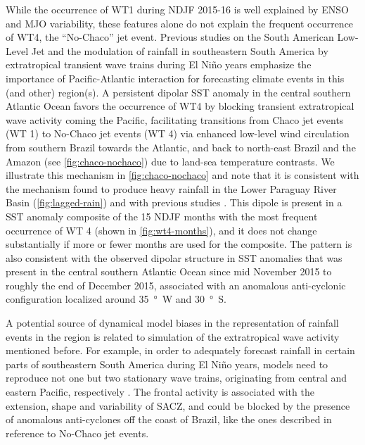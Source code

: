 \documentclass{ametsoc}
\begin{document}
While the occurrence of WT1 during NDJF 2015-16 is well explained by ENSO and MJO variability, these features alone do not explain the frequent occurrence of WT4, the ``No-Chaco'' jet event.
Previous studies on the South American Low-Level Jet \citep[e.g.,][]{Vera:2006ib} and the modulation of rainfall in southeastern South America by extratropical transient wave trains during El Ni\~no years \citep{Barreiro:2017ct} emphasize the importance of Pacific-Atlantic interaction for forecasting climate events in this (and other) region(s).
A persistent dipolar SST anomaly in the central southern Atlantic Ocean favors the occurrence of WT4 by blocking transient extratropical wave activity coming the Pacific, facilitating transitions from Chaco jet events (WT 1) to No-Chaco jet events (WT 4) via enhanced low-level wind circulation from southern Brazil towards the Atlantic, and back to north-east Brazil and the Amazon (see \cref{fig:chaco-nochaco}) due to land-sea temperature contrasts.
We illustrate this mechanism in \cref{fig:chaco-nochaco} and note that it is consistent with the mechanism found to produce heavy rainfall in the Lower Paraguay River Basin (\cref{fig:lagged-rain}) and with previous studies \citep[e.g.,][]{Vera:2006ib,Liebmann:2004kx,Salio:2002ev}.
This dipole is present in a SST anomaly composite of the 15 NDJF months with the most frequent occurrence of WT 4 (shown in \cref{fig:wt4-months}), and it does not change substantially if more or fewer months are used for the composite.
The pattern is also consistent with the observed dipolar structure in SST anomalies that was present in the central southern Atlantic Ocean since mid November 2015 to roughly the end of December 2015, associated with an anomalous anti-cyclonic configuration localized around \SI{35}{\degree W} and \SI{30}{\degree S}.

A potential source of dynamical model biases in the representation of rainfall events in the region is related to simulation of the extratropical wave activity mentioned before.
For example, in order to adequately forecast rainfall in certain parts of southeastern South America during El Ni\~no years, models need to reproduce not one but two stationary wave trains, originating from central and eastern Pacific, respectively \citep{Barreiro:2017ct}.
The frontal activity is associated with the extension, shape and variability of SACZ, and could be blocked by the presence of anomalous anti-cyclones off the coast of Brazil, like the ones described in reference to No-Chaco jet events.
\end{document}
